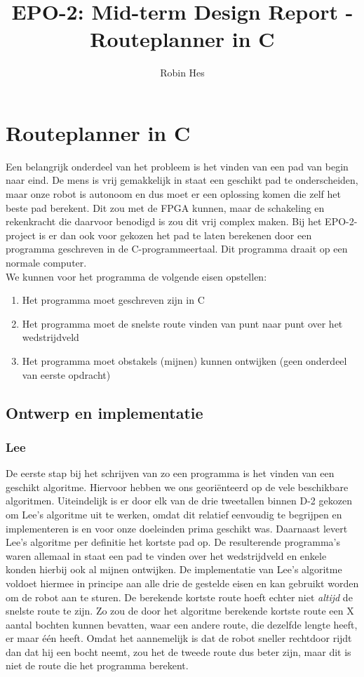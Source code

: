 \documentclass{report}
\title{EPO-2: Mid-term Design Report - Routeplanner in C}
\author{Robin Hes}
\begin{document}
\chapter{Routeplanner in C}
\label{ch:route}

Een belangrijk onderdeel van het probleem is het vinden van een pad van begin naar eind. De mens is vrij gemakkelijk in staat een geschikt pad te onderscheiden, maar onze robot is autonoom en dus moet er een oplossing komen die zelf het beste pad berekent. Dit zou met de FPGA kunnen, maar de schakeling en rekenkracht die daarvoor benodigd is zou dit vrij complex maken. Bij het EPO-2-project is er dan ook voor gekozen het pad te laten berekenen door een programma geschreven in de C-programmeertaal. Dit programma draait op een normale computer. \\

\noindent
We kunnen voor het programma de volgende eisen opstellen:

\begin{enumerate}
	\item Het programma moet geschreven zijn in C
	\item Het programma moet de snelste route vinden van punt naar punt over het wedstrijdveld
	\item Het programma moet obstakels (mijnen) kunnen ontwijken (geen onderdeel van eerste opdracht)
\end{enumerate}

\section{Ontwerp en implementatie}
\label{sec:ontwerp-impl}

\subsection{Lee}
\label{ssec:lee}

De eerste stap bij het schrijven van zo een programma is het vinden van een geschikt algoritme. Hiervoor hebben we ons georiënteerd op de vele beschikbare algoritmen. Uiteindelijk is er door elk van de drie tweetallen binnen D-2 gekozen om Lee's algoritme uit te werken, omdat dit relatief eenvoudig te begrijpen en implementeren is en voor onze doeleinden prima geschikt was. Daarnaast levert Lee's algoritme per definitie het kortste pad op. De resulterende programma's waren allemaal in staat een pad te vinden over het wedstrijdveld en enkele konden hierbij ook al mijnen ontwijken. De implementatie van Lee's algoritme voldoet hiermee in principe aan alle drie de gestelde eisen en kan gebruikt worden om de robot aan te sturen. De berekende kortste route hoeft echter niet \textit{altijd} de snelste route te zijn. Zo zou de door het algoritme berekende kortste route een X aantal bochten kunnen bevatten, waar een andere route, die dezelfde lengte heeft, er maar één heeft. Omdat het aannemelijk is dat de robot sneller rechtdoor rijdt dan dat hij een bocht neemt, zou het de tweede route dus beter zijn, maar dit is niet de route die het programma berekent.
\end{document}
